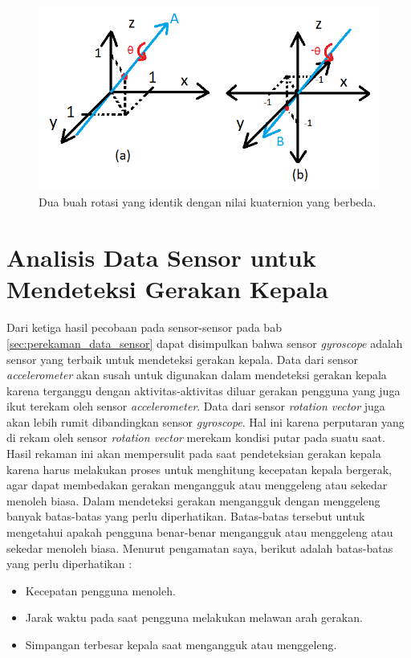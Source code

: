 \begin{figure}[htbp]
\centering
\includegraphics[scale=0.7]{Gambar/penjelasan-perputaran-quaternion-android-sensor.png}
\caption{Dua buah rotasi yang identik dengan nilai kuaternion yang berbeda.} 
\label{fig:penjelasan-perputaran-quaternion-android-sensor}
\end{figure}

\section{Analisis Data Sensor untuk Mendeteksi Gerakan Kepala}

Dari ketiga hasil pecobaan pada sensor-sensor pada bab \ref{sec:perekaman_data_sensor} dapat disimpulkan bahwa sensor \textit{gyroscope} adalah sensor yang terbaik untuk mendeteksi gerakan kepala. Data dari sensor \textit{accelerometer} akan susah untuk digunakan dalam mendeteksi gerakan kepala karena terganggu dengan aktivitas-aktivitas diluar gerakan pengguna yang juga ikut terekam oleh sensor \textit{accelerometer}. Data dari sensor \textit{rotation vector} juga akan lebih rumit dibandingkan sensor \textit{gyroscope}. Hal ini karena perputaran yang di rekam oleh sensor \textit{rotation vector} merekam kondisi putar pada suatu saat. Hasil rekaman ini akan mempersulit pada saat pendeteksian gerakan kepala karena harus melakukan proses untuk menghitung kecepatan kepala bergerak, agar dapat membedakan gerakan mengangguk atau menggeleng atau sekedar menoleh biasa. 
Dalam mendeteksi gerakan mengangguk dengan menggeleng banyak batas-batas yang perlu diperhatikan. Batas-batas tersebut untuk mengetahui apakah pengguna benar-benar mengangguk atau menggeleng atau sekedar menoleh biasa. Menurut pengamatan saya, berikut adalah batas-batas yang perlu diperhatikan :

\begin{itemize}
	\item Kecepatan pengguna menoleh.
	\item Jarak waktu pada saat pengguna melakukan melawan arah gerakan.
	\item Simpangan terbesar kepala saat mengangguk atau menggeleng.
\end{itemize}

